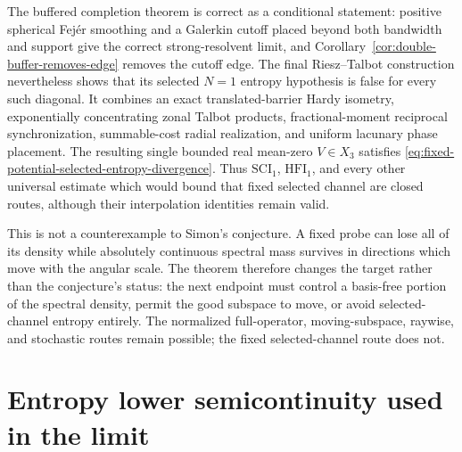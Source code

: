 \documentclass[11pt]{article}
\theoremstyle{definition}
\theoremstyle{remark}
\begin{document}
The buffered completion theorem is correct as a conditional statement:
positive spherical Fej\'er smoothing and a Galerkin cutoff placed beyond both
bandwidth and support give the correct strong-resolvent limit, and
Corollary~\ref{cor:double-buffer-removes-edge} removes the cutoff edge.  The
final Riesz--Talbot construction nevertheless shows that its selected $N=1$
entropy hypothesis is false for every such diagonal.  It combines an exact
translated-barrier Hardy isometry, exponentially concentrating zonal Talbot
products, fractional-moment reciprocal synchronization, summable-cost radial
realization, and uniform lacunary phase placement.  The resulting single
bounded real mean-zero $V\in X_3$ satisfies
\eqref{eq:fixed-potential-selected-entropy-divergence}.  Thus
$\mathrm{SCI}_1$, $\mathrm{HFI}_1$, and every other universal estimate which
would bound that fixed selected channel are closed routes, although their
interpolation identities remain valid.

This is not a counterexample to Simon's conjecture.  A fixed probe can lose
all of its density while absolutely continuous spectral mass survives in
directions which move with the angular scale.  The theorem therefore changes
the target rather than the conjecture's status: the next endpoint must control
a basis-free portion of the spectral density, permit the good subspace to
move, or avoid selected-channel entropy entirely.  The normalized
full-operator, moving-subspace, raywise, and stochastic routes remain possible;
the fixed selected-channel route does not.

\appendix

\section{Entropy lower semicontinuity used in the limit}
\end{document}
